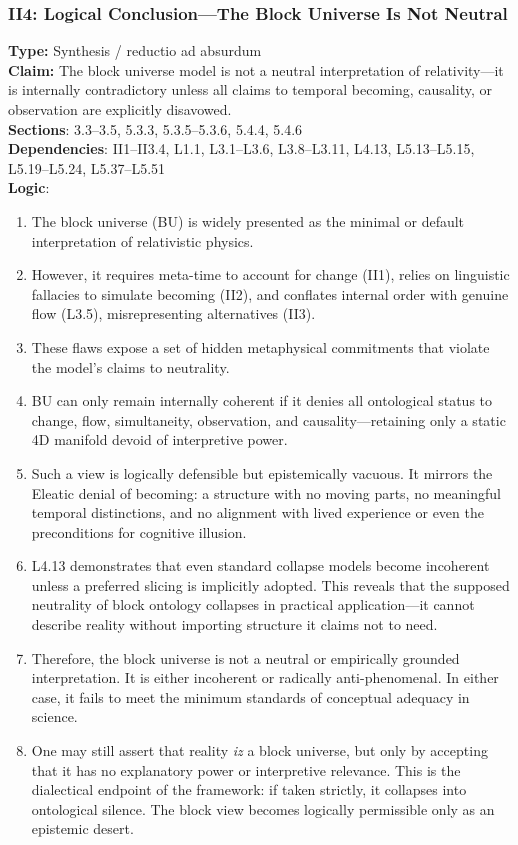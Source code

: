 \documentclass[12pt]{book}
\begin{document}
\subsubsection*{II4: Logical Conclusion---The Block Universe Is Not Neutral}
\label{appendix:II4}
\textbf{Type:} Synthesis / reductio ad absurdum\\
\textbf{Claim:} The block universe model is not a neutral interpretation of relativity---it is internally contradictory unless all claims to temporal becoming, causality, or observation are explicitly disavowed.\\
\textbf{Sections}: 3.3–3.5, 5.3.3, 5.3.5–5.3.6, 5.4.4, 5.4.6\\
\textbf{Dependencies}: II1–II3.4, L1.1, L3.1–L3.6, L3.8–L3.11, L4.13, L5.13–L5.15, L5.19–L5.24, L5.37–L5.51\\
\textbf{Logic}:
\begin{enumerate}
  \item The block universe (BU) is widely presented as the minimal or default interpretation of relativistic physics.
  \item However, it requires meta-time to account for change (II1), relies on linguistic fallacies to simulate becoming (II2), and conflates internal order with genuine flow (L3.5), misrepresenting alternatives (II3).
  \item These flaws expose a set of hidden metaphysical commitments that violate the model's claims to neutrality.
  \item BU can only remain internally coherent if it denies all ontological status to change, flow, simultaneity, observation, and causality---retaining only a static 4D manifold devoid of interpretive power.
  \item Such a view is logically defensible but epistemically vacuous. It mirrors the Eleatic denial of becoming: a structure with no moving parts, no meaningful temporal distinctions, and no alignment with lived experience or even the preconditions for cognitive illusion.
  \item L4.13 demonstrates that even standard collapse models become incoherent unless a preferred slicing is implicitly adopted. This reveals that the supposed neutrality of block ontology collapses in practical application---it cannot describe reality without importing structure it claims not to need.
  \item Therefore, the block universe is not a neutral or empirically grounded interpretation. It is either incoherent or radically anti-phenomenal. In either case, it fails to meet the minimum standards of conceptual adequacy in science.
  \item One may still assert that reality \textit{iz} a block universe, but only by accepting that it has no explanatory power or interpretive relevance. This is the dialectical endpoint of the framework: if taken strictly, it collapses into ontological silence. The block view becomes logically permissible only as an epistemic desert.
\end{enumerate}
\end{document}
